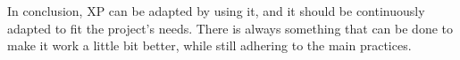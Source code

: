 In conclusion, XP can be adapted by using it, and it should be continuously adapted to fit the project's needs. 
There is always something that can be done to make it work a little bit better, while still adhering to the main practices.




